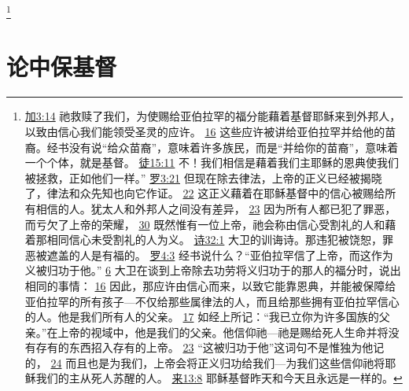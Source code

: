 \documentclass[12pt, a4paper, oneside]{ctexart}
\begin{document}
	\footnote {
		\href{https://biblehub.com/galatians/3-14.htm}{加3:14} 祂救赎了我们，为使赐给亚伯拉罕的福分能藉着基督耶稣来到外邦人，以致由信心我们能领受圣灵的应许。
		\href{https://biblehub.com/galatians/3-16.htm}{16} 这些应许被讲给亚伯拉罕并给他的苗裔。经书没有说“给众苗裔”，意味着许多族民，而是“并给你的苗裔”，意味着一个个体，就是基督。
		\href{https://biblehub.com/acts/15-11.htm}{徒15:11} 不！我们相信是藉着我们主耶稣的恩典使我们被拯救，正如他们一样。”
		\href{https://biblehub.com/romans/3-21.htm}{罗3:21} 但现在除去律法，上帝的正义已经被揭晓了，律法和众先知也向它作证。
		\href{https://biblehub.com/romans/3-22.htm}{22} 这正义藉着在耶稣基督中的信心被赐给所有相信的人。犹太人和外邦人之间没有差异，
		\href{https://biblehub.com/romans/3-23.htm}{23} 因为所有人都已犯了罪恶，而亏欠了上帝的荣耀，
		\href{https://biblehub.com/romans/3-30.htm}{30} 既然惟有一位上帝，祂会称由信心受割礼的人和藉着那相同信心未受割礼的人为义。
		\href{https://biblehub.com/psalms/32-1.htm}{诗32:1} 大卫的训诲诗。那违犯被饶恕，罪恶被遮盖的人是有福的。
		\href{https://biblehub.com/romans/4-3.htm}{罗4:3} 经书说什么？“亚伯拉罕信了上帝，而这作为义被归功于他。”
		\href{https://biblehub.com/romans/4-6.htm}{6} 大卫在谈到上帝除去功劳将义归功于的那人的福分时，说出相同的事情：
		\href{https://biblehub.com/romans/4-16.htm}{16} 因此，那应许由信心而来，以致它能靠恩典，并能被保障给亚伯拉罕的所有孩子---不仅给那些属律法的人，而且给那些拥有亚伯拉罕信心的人。他是我们所有人的父亲。
		\href{https://biblehub.com/romans/4-17.htm}{17} 如经上所记：“我已立你为许多国族的父亲。”在上帝的视域中，他是我们的父亲。他信仰祂---祂是赐给死人生命并将没有存有的东西招入存有的上帝。
		\href{https://biblehub.com/romans/4-23.htm}{23} “这被归功于他”这词句不是惟独为他记的，
		\href{https://biblehub.com/romans/4-24.htm}{24} 而且也是为我们，上帝会将正义归功给我们---为我们这些信仰祂将耶稣我们的主从死人苏醒的人。
		\href{https://biblehub.com/hebrews/13-8.htm}{来13:8} 耶稣基督昨天和今天且永远是一样的。
	}

\section{论中保基督}
\end{document}
